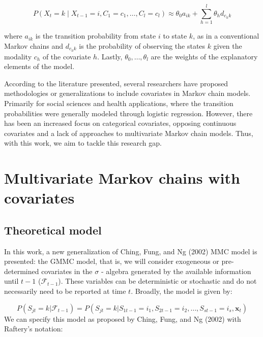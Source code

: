 \begin{equation} 
P(X_t = k \mid X_{t-1} = i, C_1 = c_1, \dots, C_l = c_l) \approx \theta_0 a_{ik} + \sum_{h=1}^l \theta_h d_{c_{h}k} \label{eq:eq7}
\end{equation}

where \(a_{ik}\) is the transition probability from state \(i\) to state \(k\), as in a conventional Markov chains and \(d_{c_{h}k}\) is the probability of observing the states \(k\) given the modality \(c_h\) of the covariate \(h\). Lastly, \(\theta_0, \dots, \theta_l\) are the weights of the explanatory elements of the model.

According to the literature presented, several researchers have proposed methodologies or generalizations to include covariates in Markov chain models. Primarily for social sciences and health applications, where the transition probabilities were generally modeled through logistic regression. However, there has been an increased focus on categorical covariates, opposing continuous covariates and a lack of approaches to multivariate Markov chain models. Thus, with this work, we aim to tackle this research gap.

\hypertarget{multivariate-markov-chains-with-covariates}{%
\section{Multivariate Markov chains with covariates}\label{multivariate-markov-chains-with-covariates}}

\hypertarget{theoretical-model}{%
\subsection{Theoretical model}\label{theoretical-model}}

In this work, a new generalization of Ching, Fung, and Ng (2002) MMC model is presented: the GMMC model, that is, we will consider exogeneous or pre-determined covariates in the \(\sigma\) - algebra generated by the available information until \(t-1\) (\(\mathcal{F}_{t-1}\)). These variables can be deterministic or stochastic and do not necessarily need to be reported at time \(t\). Broadly, the model is given by:

\begin{equation}
P(S_{jt} = k | \mathcal{ F}_{t-1} ) = P(S_{jt} =  k | S_{1t-1} = i_1, S_{2t-1} = i_2, \dots, S_{st-1} = i_s, \boldsymbol{x}_t) \label{eq:eq8}
\end{equation} We can specify this model as proposed by Ching, Fung, and Ng (2002) with Raftery's notation:

